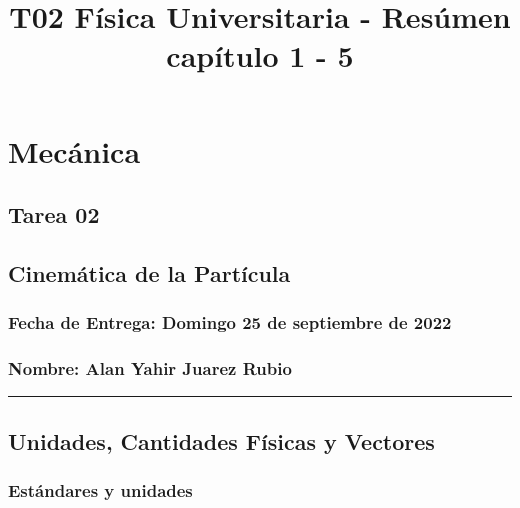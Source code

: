 \documentclass[
]{article}
\title{T02 Física Universitaria - Resúmen capítulo 1 - 5}
\author{}
\date{}
\begin{document}
\maketitle

\hypertarget{mecuxe1nica}{%
\section{Mecánica}\label{mecuxe1nica}}

\hypertarget{tarea-02}{%
\subsection{Tarea 02}\label{tarea-02}}

\hypertarget{cinemuxe1tica-de-la-partuxedcula}{%
\subsection{Cinemática de la
Partícula}\label{cinemuxe1tica-de-la-partuxedcula}}

\hypertarget{fecha-de-entrega-domingo-25-de-septiembre-de-2022}{%
\subsubsection{Fecha de Entrega: Domingo 25 de septiembre de
2022}\label{fecha-de-entrega-domingo-25-de-septiembre-de-2022}}

\hypertarget{nombre-alan-yahir-juarez-rubio}{%
\subsubsection{Nombre: Alan Yahir Juarez
Rubio}\label{nombre-alan-yahir-juarez-rubio}}

\begin{center}\rule{0.5\linewidth}{0.5pt}\end{center}

\hypertarget{unidades-cantidades-fuxedsicas-y-vectores}{%
\subsection{Unidades, Cantidades Físicas y
Vectores}\label{unidades-cantidades-fuxedsicas-y-vectores}}

\hypertarget{estuxe1ndares-y-unidades}{%
\subsubsection{Estándares y unidades}\label{estuxe1ndares-y-unidades}}
\end{document}
